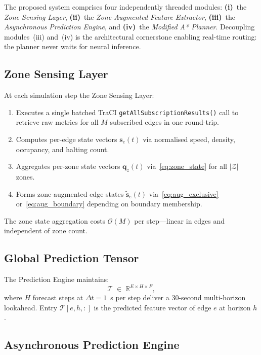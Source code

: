 \documentclass[journal,letterpaper,10pt]{IEEEtran}
\theoremstyle{definition}
\theoremstyle{remark}
\newcommand{\bigO}[1]{\mathcal{O}\!\left(#1\right)}
\newcommand{\R}{\mathbb{R}}
\newcommand{\zones}{\mathcal{Z}}
\newcommand{\zstate}{\mathbf{q}}
\begin{document}
The proposed system comprises four independently threaded modules:
\textbf{(i)}~the \emph{Zone Sensing Layer},
\textbf{(ii)}~the \emph{Zone-Augmented Feature Extractor},
\textbf{(iii)}~the \emph{Asynchronous Prediction Engine}, and
\textbf{(iv)}~the \emph{Modified A* Planner}.
Decoupling modules~(iii) and~(iv) is the architectural cornerstone
enabling real-time routing: the planner never waits for neural
inference.

\subsection{Zone Sensing Layer}

At each simulation step the Zone Sensing Layer:
\begin{enumerate}
  \item Executes a single batched TraCI
        \texttt{getAllSubscriptionResults()} call to retrieve raw
        metrics for all $M$ subscribed edges in one round-trip.
  \item Computes per-edge state vectors $\mathbf{s}_e(t)$ via
        normalised speed, density, occupancy, and halting count.
  \item Aggregates per-zone state vectors $\zstate_z(t)$
        via~\eqref{eq:zone_state} for all $|\zones|$ zones.
  \item Forms zone-augmented edge states
        $\tilde{\mathbf{s}}_e(t)$ via~\eqref{eq:aug_exclusive}
        or~\eqref{eq:aug_boundary} depending on boundary
        membership.
\end{enumerate}
The zone state aggregation costs $\bigO{M}$ per step---linear in
edges and independent of zone count.

\subsection{Global Prediction Tensor}

The Prediction Engine maintains:
\begin{equation}
  \mathcal{T}\;\in\;\R^{E\times H\times F},
  \label{eq:tensor}
\end{equation}
where $H$ forecast steps at $\Delta t=1$~s per step deliver a
30-second multi-horizon lookahead.  Entry $\mathcal{T}[e,h,:]$ is
the predicted feature vector of edge $e$ at horizon $h$.

\subsection{Asynchronous Prediction Engine}
\end{document}
